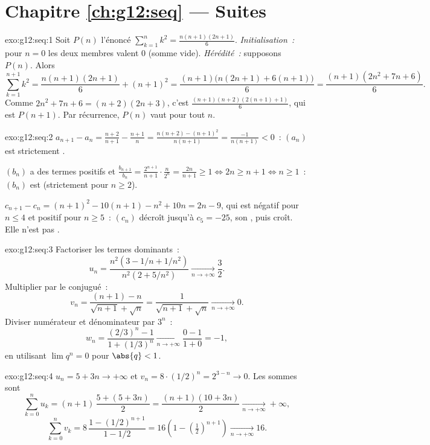 \section*{Chapitre \ref{ch:g12:seq} --- Suites}

\begin{solution}{exo:g12:seq:1}
Soit $P(n)$ l'énoncé $\sum_{k=1}^{n} k^2 = \frac{n(n+1)(2n+1)}{6}$.
\emph{Initialisation~:} pour $n = 0$ les deux membres valent $0$ (somme
vide).
\emph{Hérédité~:} supposons $P(n)$. Alors
\[
\sum_{k=1}^{n+1} k^2 = \frac{n(n+1)(2n+1)}{6} + (n+1)^2
= \frac{(n+1)\bigl(n(2n+1) + 6(n+1)\bigr)}{6}
= \frac{(n+1)(2n^2 + 7n + 6)}{6}.
\]
Comme $2n^2 + 7n + 6 = (n+2)(2n+3)$, c'est
$\frac{(n+1)(n+2)(2(n+1)+1)}{6}$, qui est $P(n+1)$. Par récurrence,
$P(n)$ vaut pour tout $n$.
\end{solution}

\begin{solution}{exo:g12:seq:2}
$a_{n+1} - a_n = \frac{n+2}{n+1} - \frac{n+1}{n}
= \frac{n(n+2) - (n+1)^2}{n(n+1)} = \frac{-1}{n(n+1)} < 0$~: $(a_n)$ est
strictement .

$(b_n)$ a des termes positifs et
$\frac{b_{n+1}}{b_n} = \frac{2^{n+1}}{n+1}\cdot\frac{n}{2^n} =
\frac{2n}{n+1} \geq 1 \iff 2n \geq n+1 \iff n \geq 1$~: $(b_n)$ est
 (strictement pour $n \geq 2$).

$c_{n+1} - c_n = (n+1)^2 - 10(n+1) - n^2 + 10n = 2n - 9$, qui est négatif
pour $n \leq 4$ et positif pour $n \geq 5$~: $(c_n)$ décroît jusqu'à
$c_5 = -25$, son , puis croît. Elle n'est pas .
\end{solution}

\begin{solution}{exo:g12:seq:3}
Factoriser les termes dominants~:
\[
u_n = \frac{n^2(3 - 1/n + 1/n^2)}{n^2(2 + 5/n^2)} \xrightarrow[n\to+\infty]{} \frac{3}{2}.
\]
Multiplier par le conjugué~:
\[
v_n = \frac{(n+1) - n}{\sqrt{n+1} + \sqrt{n}} = \frac{1}{\sqrt{n+1}+\sqrt{n}}
\xrightarrow[n\to+\infty]{} 0.
\]
Diviser numérateur et dénominateur par $3^n$~:
\[
w_n = \frac{(2/3)^n - 1}{1 + (1/3)^n} \xrightarrow[n\to+\infty]{} \frac{0-1}{1+0} = -1,
\]
en utilisant $\lim q^n = 0$ pour $\abs{q} < 1$.
\end{solution}

\begin{solution}{exo:g12:seq:4}
$u_n = 5 + 3n \to +\infty$ et $v_n = 8 \cdot (1/2)^n = 2^{3-n} \to 0$.
Les sommes sont
\[
\sum_{k=0}^{n} u_k = (n+1)\,\frac{5 + (5+3n)}{2} = \frac{(n+1)(10+3n)}{2}
\xrightarrow[n\to+\infty]{} +\infty,
\]
\[
\sum_{k=0}^{n} v_k = 8\,\frac{1 - (1/2)^{n+1}}{1 - 1/2}
= 16\left(1 - \left(\tfrac{1}{2}\right)^{n+1}\right)
\xrightarrow[n\to+\infty]{} 16 .
\]
\end{solution}

